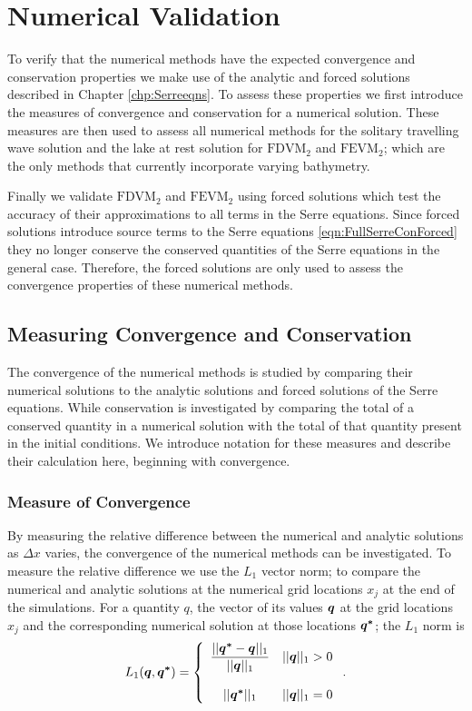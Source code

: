 
\chapter{Numerical Validation}
\label{chp:NumMethodComp}


To verify that the numerical methods have the expected convergence and conservation properties we make use of the analytic and forced solutions described in Chapter \ref{chp:Serreeqns}. To assess these properties we first introduce the measures of convergence and conservation for a numerical solution. These measures are then used to assess all numerical methods for the solitary travelling wave solution and the lake at rest solution for $\text{FDVM}_2$ and $\text{FEVM}_2$; which are the only methods that currently incorporate varying bathymetry. 

Finally we validate $\text{FDVM}_2$ and $\text{FEVM}_2$ using forced solutions which test the accuracy of their approximations to all terms in the Serre equations. Since forced solutions introduce source terms to the Serre equations \eqref{eqn:FullSerreConForced} they no longer conserve the conserved quantities of the Serre equations in the general case. Therefore, the forced solutions are only used to assess the convergence properties of these numerical methods.

\section{Measuring Convergence and Conservation}
The convergence of the numerical methods is studied by comparing their numerical solutions to the analytic solutions and forced solutions of the Serre equations. While conservation is investigated by comparing the total of a conserved quantity in a numerical solution with the total of that quantity present in the initial conditions. We introduce notation for these measures and describe their calculation here, beginning with convergence.

\subsection{Measure of Convergence}
By measuring the relative difference between the numerical and analytic solutions as $\Delta x$ varies, the convergence of the numerical methods can be investigated. To measure the relative difference we use the $L_1$ vector norm; to compare the numerical and analytic solutions at the numerical grid locations $x_j$ at the end of the simulations. For a quantity $q$, the vector of its values $\boldsymbol{q}$ at the grid locations $x_j$ and the corresponding numerical solution at those locations $\boldsymbol{q^*}$; the $L_1$ norm is
\begin{equation}
L_1(\boldsymbol{q},\boldsymbol{q^*}) =  \left\lbrace \begin{array}{c r} 
\dfrac{||\boldsymbol{q^*} - \boldsymbol{q}||_{1}}{||\boldsymbol{q}||_{1}} & ||\boldsymbol{q}||_{1} > 0 \\ \\
{||\boldsymbol{q^*}||_{1}} & ||\boldsymbol{q}||_{1} = 0  \end{array}\right. . 
\label{eqn:L1qdef} 
\end{equation}


